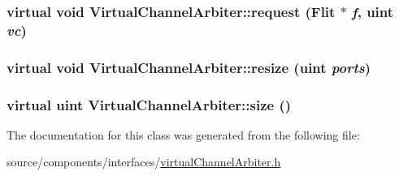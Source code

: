 \hypertarget{classVirtualChannelArbiter_ecb14402319f140f7dc422d03e21ca48}{
\subsubsection[{request}]{\setlength{\rightskip}{0pt plus 5cm}virtual void VirtualChannelArbiter::request ({\bf Flit} $\ast$ {\em f}, \/  {\bf uint} {\em vc})}}
\label{classVirtualChannelArbiter_ecb14402319f140f7dc422d03e21ca48}


\hypertarget{classVirtualChannelArbiter_6bb7faf3f8928b51f78f2a8c9179b2eb}{
\subsubsection[{resize}]{\setlength{\rightskip}{0pt plus 5cm}virtual void VirtualChannelArbiter::resize ({\bf uint} {\em ports})}}
\label{classVirtualChannelArbiter_6bb7faf3f8928b51f78f2a8c9179b2eb}


\hypertarget{classVirtualChannelArbiter_f712fea20cab6cb57b5a1ed43fc2d3c8}{
\subsubsection[{size}]{\setlength{\rightskip}{0pt plus 5cm}virtual {\bf uint} VirtualChannelArbiter::size ()}}
\label{classVirtualChannelArbiter_f712fea20cab6cb57b5a1ed43fc2d3c8}




The documentation for this class was generated from the following file:\begin{CompactItemize}
\item 
source/components/interfaces/\hyperlink{virtualChannelArbiter_8h}{virtualChannelArbiter.h}\end{CompactItemize}

